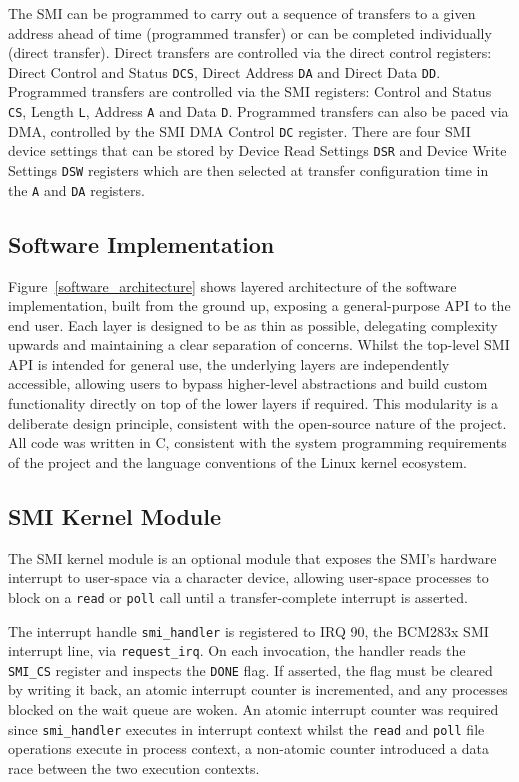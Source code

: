 \documentclass[final]{cmpreport}
\begin{document}
The SMI can be programmed to carry out a sequence of transfers to a given address ahead of time (programmed transfer) or can be completed individually (direct transfer). Direct transfers are controlled via the direct control registers: Direct Control and Status \texttt{DCS}, Direct Address \texttt{DA} and Direct Data \texttt{DD}. Programmed transfers are controlled via the SMI registers: Control and Status \texttt{CS}, Length \texttt{L}, Address \texttt{A} and Data \texttt{D}. Programmed transfers can also be paced via DMA, controlled by the SMI DMA Control \texttt{DC} register. There are four SMI device settings that can be stored by Device Read Settings \texttt{DSR} and Device Write Settings \texttt{DSW} registers which are then selected at transfer configuration time in the \texttt{A} and \texttt{DA} registers.

\subsection{Software Implementation}
Figure~\ref{software_architecture} shows layered architecture of the software implementation, built from the ground up, exposing a general-purpose API to the end user. Each layer is designed to be as thin as possible, delegating complexity upwards and maintaining a clear separation of concerns. Whilst the top-level SMI API is intended for general use, the underlying layers are independently accessible, allowing users to bypass higher-level abstractions and build custom functionality directly on top of the lower layers if required. This modularity is a deliberate design principle, consistent with the open-source nature of the project. All code was written in C, consistent with the system programming requirements of the project and the language conventions of the Linux kernel ecosystem.

\subsection{SMI Kernel Module}
The SMI kernel module is an optional module that exposes the SMI's hardware interrupt to user-space via a character device, allowing user-space processes to block on a \texttt{read} or \texttt{poll} call until a transfer-complete interrupt is asserted.

The interrupt handle \texttt{smi\_handler} is registered to IRQ 90, the BCM283x SMI interrupt line, via \texttt{request\_irq}. On each invocation, the handler reads the \texttt{SMI\_CS} register and inspects the \texttt{DONE} flag. If asserted, the flag must be cleared by writing it back, an atomic interrupt counter is incremented, and any processes blocked on the wait queue are woken. An atomic interrupt counter was required since \texttt{smi\_handler} executes in interrupt context whilst the \texttt{read} and \texttt{poll} file operations execute in process context, a non-atomic counter introduced a data race between the two execution contexts.
\end{document}
